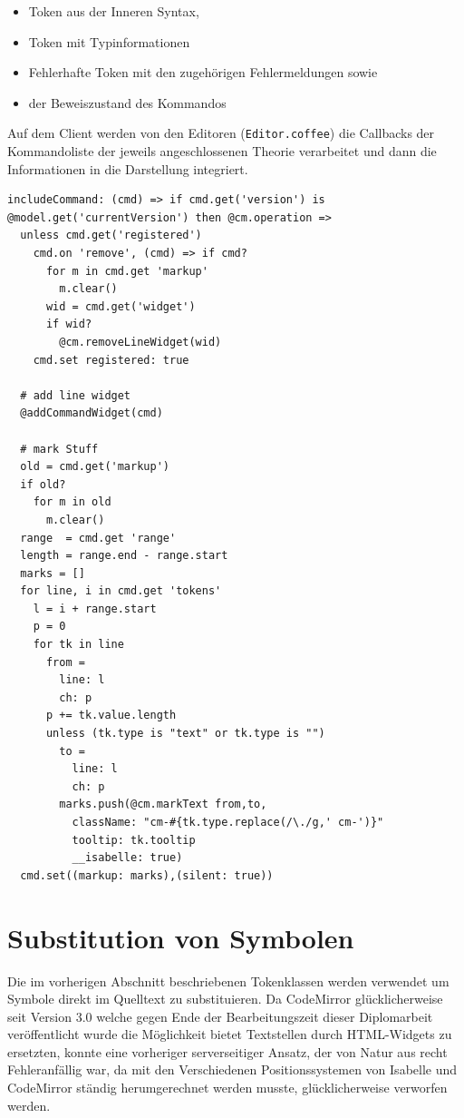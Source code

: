 \begin{itemize}
  \item Token aus der Inneren Syntax,
  \item Token mit Typinformationen
  \item Fehlerhafte Token mit den zugehörigen Fehlermeldungen sowie
  \item der Beweiszustand des Kommandos
\end{itemize}

Auf dem Client werden von den Editoren (\texttt{Editor.coffee}) die Callbacks der Kommandoliste der
jeweils angeschlossenen Theorie verarbeitet und dann die Informationen in die Darstellung
integriert.

\begin{lstlisting}
includeCommand: (cmd) => if cmd.get('version') is @model.get('currentVersion') then @cm.operation =>
  unless cmd.get('registered')      
    cmd.on 'remove', (cmd) => if cmd?
      for m in cmd.get 'markup'
        m.clear()
      wid = cmd.get('widget')
      if wid?
        @cm.removeLineWidget(wid)
    cmd.set registered: true

  # add line widget
  @addCommandWidget(cmd)

  # mark Stuff
  old = cmd.get('markup')
  if old?
    for m in old
      m.clear()
  range  = cmd.get 'range'
  length = range.end - range.start
  marks = []
  for line, i in cmd.get 'tokens'
    l = i + range.start
    p = 0
    for tk in line
      from = 
        line: l
        ch: p
      p += tk.value.length
      unless (tk.type is "text" or tk.type is "")
        to =
          line: l
          ch: p              
        marks.push(@cm.markText from,to,
          className: "cm-#{tk.type.replace(/\./g,' cm-')}"
          tooltip: tk.tooltip
          __isabelle: true)
  cmd.set((markup: marks),(silent: true))
\end{lstlisting}



\section{Substitution von Symbolen}

Die im vorherigen Abschnitt beschriebenen Tokenklassen werden verwendet um Symbole direkt im
Quelltext zu substituieren. Da CodeMirror glücklicherweise seit Version 3.0 welche gegen Ende der
Bearbeitungszeit dieser Diplomarbeit veröffentlicht wurde die Möglichkeit bietet Textstellen durch
HTML-Widgets zu ersetzten, konnte eine vorheriger serverseitiger Ansatz, der von Natur aus recht
Fehleranfällig war, da mit den Verschiedenen Positionssystemen von Isabelle und CodeMirror ständig
herumgerechnet werden musste, glücklicherweise verworfen werden.

